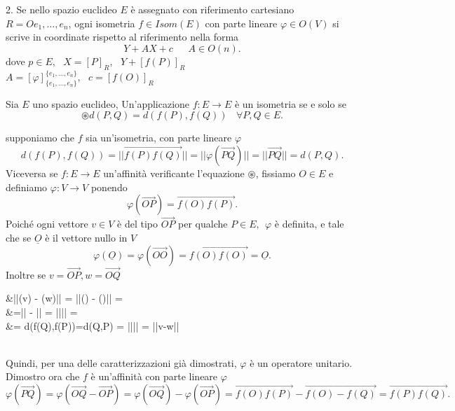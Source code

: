 \documentclass[12px]{article}
\begin{document}
2. Se nello spazio euclideo $E$ è assegnato con riferimento cartesiano $R = Oe_1,\ldots,e_n$, ogni isometria $f\in Isom(E)$ con parte lineare $\varphi\in O(V)$ si scrive in coordinate rispetto al riferimento nella forma
\[
Y + AX + c \ \ \ \ \ \ \ A\in O(n)
.\] 
dove $p\in E, \ \ \ X = [P]_R, \ \ \ Y + [f(P)]_R$\\
$A = [\varphi]^{\{e_1,\ldots,e_n\}}_{\{e_1,\ldots,e_n\}}, \ \ \ c = [f(O)]_R$
\begin{teo}
	Sia $E$ uno spazio euclideo, Un'applicazione $f:E \rightarrow E$ è un isometria se e solo se
	\[
	 \circledast d(P,Q) = d(f(P),f(Q))\ \ \ \ \forall P,Q\in E
	.\] 
\end{teo}
\begin{dimo}
	supponiamo che $f$ sia un'isometria, con parte lineare $\varphi$ 
	\[
	d(f(P),f(Q)) = ||\overrightarrow{f(P)f(Q)}|| = ||\varphi(\overrightarrow{PQ})|| = ||\overrightarrow{PQ}|| = d(P,Q)
	.\] 
	Viceversa se $f: E \rightarrow E$ un'affinità verificante l'equazione $\circledast$, fissiamo $O\in E$ e definiamo $\varphi:V \rightarrow V$ ponendo
	\[
	 \varphi(\overrightarrow{OP}) = \overrightarrow{f(O)f(P)}
	.\] 
	Poiché ogni vettore $v\in V$ è del tipo $\overrightarrow{OP}$ per qualche $P\in E, \ \ \varphi$ è definita, e tale che se $\underline{O}$ è il vettore nullo in $V$
	\[
		\varphi(\underline{O}) = \varphi(\overrightarrow{OO}) = \overrightarrow{f(O)f(O)} = \underline{O}
	.\]
	Inoltre se $v = \overrightarrow{OP}, w = \overrightarrow{OQ}$ \\
	\begin{aligned}
		&||\varphi(v) - \varphi(w)|| = ||\varphi() - \varphi()|| =\\
		&=|| - || = |||| =\\&= d(f(Q),f(P))=d(Q,P) = |||| = ||v-w||
	\end{aligned}\\
	Quindi, per una delle caratterizzazioni già dimostrati, $\varphi$ è un operatore unitario. Dimostro ora che $f$ è un'affinità con parte lineare $\varphi$
	\[
	\varphi(\overrightarrow{PQ}) = \varphi(\overrightarrow{OQ} - \overrightarrow{OP} ) = \varphi(\overrightarrow{OQ}) - \varphi(\overrightarrow{OP}) = \overrightarrow{f(O)f(P)} - \overrightarrow{f(O) - f(Q)} = \overrightarrow{f(P)f(Q)}
	.\] 
\end{dimo}
\end{document}
